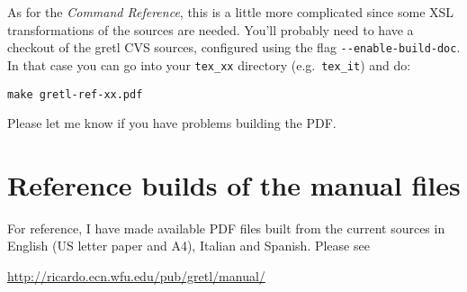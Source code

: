 \documentclass{article}
\begin{document}
As for the \textit{Command Reference}, this is a little more
complicated since some XSL transformations of the sources are needed.
You'll probably need to have a checkout of the \textsf{gretl} CVS
sources, configured using the flag \verb|--enable-build-doc|.  In that
case you can go into your \texttt{tex\_xx} directory (e.g.\
\texttt{tex\_it}) and do:
%
\begin{verbatim}
make gretl-ref-xx.pdf
\end{verbatim}
%
Please let me know if you have problems building the PDF.

\section{Reference builds of the manual files}

For reference, I have made available PDF files built from the current
sources in English (US letter paper and A4), Italian and Spanish.
Please see

\begin{center}
\url{http://ricardo.ecn.wfu.edu/pub/gretl/manual/} 
\end{center}
\end{document}
